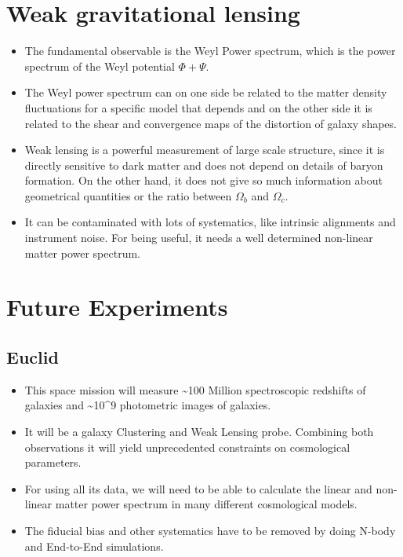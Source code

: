 \section{Weak gravitational lensing}

\begin{itemize}
\item The fundamental observable is the Weyl Power spectrum, which is the
power spectrum of the Weyl potential $\Phi+\Psi$.
\item The Weyl power spectrum can on one side be related to the matter density
fluctuations for a specific model that depends and on the other side
it is related to the shear and convergence maps of the distortion
of galaxy shapes.
\item Weak lensing is a powerful measurement of large scale structure, since
it is directly sensitive to dark matter and does not depend on details
of baryon formation. On the other hand, it does not give so much information
about geometrical quantities or the ratio between $\Omega_{b}$ and
$\Omega_{c}$.
\item It can be contaminated with lots of systematics, like intrinsic alignments
and instrument noise. For being useful, it needs a well determined
non-linear matter power spectrum.
\end{itemize}

\section{Future Experiments}

\subsection{Euclid}
\begin{itemize}
\item This space mission will measure \textasciitilde{}100 Million spectroscopic
redshifts of galaxies and \textasciitilde{}10\textasciicircum{}9 photometric
images of galaxies.
\item It will be a galaxy Clustering and Weak Lensing probe. Combining both
observations it will yield unprecedented constraints on cosmological
parameters.
\item For using all its data, we will need to be able to calculate the linear
and non-linear matter power spectrum in many different cosmological
models.
\item The fiducial bias and other systematics have to be removed by doing
N-body and End-to-End simulations.
\end{itemize}


